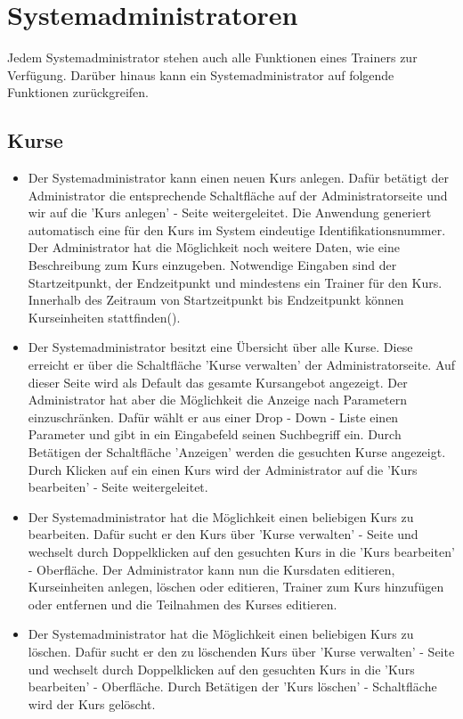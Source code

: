 \documentclass[a4paper]{scrreprt}
\newcounter{Lc}
\newcounter{Hc}
\newcommand{\stepHc}{\stepcounter{Hc}\setcounter{Lc}{0}}
\begin{document}
\section{Systemadministratoren}
Jedem Systemadministrator stehen auch alle Funktionen eines Trainers zur Verfügung. Darüber hinaus kann ein Systemadministrator auf folgende Funktionen zurückgreifen.
\stepHc
\subsection{Kurse}
\begin{itemize}
	\item {}
	Der Systemadministrator kann einen neuen Kurs anlegen. Dafür betätigt der Administrator die entsprechende Schaltfläche auf der Administratorseite und wir auf die 'Kurs anlegen' - Seite weitergeleitet. Die Anwendung generiert automatisch eine für den Kurs im System eindeutige Identifikationsnummer. Der Administrator hat die Möglichkeit noch weitere Daten, wie eine Beschreibung zum Kurs einzugeben. Notwendige Eingaben sind der Startzeitpunkt, der Endzeitpunkt und mindestens ein Trainer für den Kurs. Innerhalb des Zeitraum von Startzeitpunkt bis Endzeitpunkt können Kurseinheiten stattfinden().
	\item {}
	Der Systemadministrator besitzt eine Übersicht über alle Kurse. Diese erreicht er über die Schaltfläche 'Kurse verwalten' der Administratorseite. Auf dieser Seite wird als Default das gesamte Kursangebot angezeigt. Der Administrator hat aber die Möglichkeit die Anzeige nach Parametern einzuschränken. Dafür wählt er aus einer Drop - Down - Liste einen Parameter und gibt in ein Eingabefeld seinen Suchbegriff ein. Durch Betätigen der Schaltfläche 'Anzeigen' werden die gesuchten Kurse angezeigt. Durch Klicken auf ein einen Kurs wird der Administrator auf die 'Kurs bearbeiten' - Seite weitergeleitet.
	\item {}
	Der Systemadministrator hat die Möglichkeit einen beliebigen Kurs zu bearbeiten. Dafür sucht er den Kurs über 'Kurse verwalten' - Seite und wechselt durch Doppelklicken auf den gesuchten Kurs in die 'Kurs bearbeiten' - Oberfläche. Der Administrator kann nun die Kursdaten editieren, Kurseinheiten anlegen, löschen oder editieren, Trainer zum Kurs hinzufügen oder entfernen und die Teilnahmen des Kurses editieren.
	\item {}
	Der Systemadministrator hat die Möglichkeit einen beliebigen Kurs zu löschen. Dafür sucht er den zu löschenden Kurs über 'Kurse verwalten' - Seite und wechselt durch Doppelklicken auf den gesuchten Kurs in die 'Kurs bearbeiten' - Oberfläche. Durch Betätigen der 'Kurs löschen' - Schaltfläche wird der Kurs gelöscht.
\end{itemize}
\end{document}
